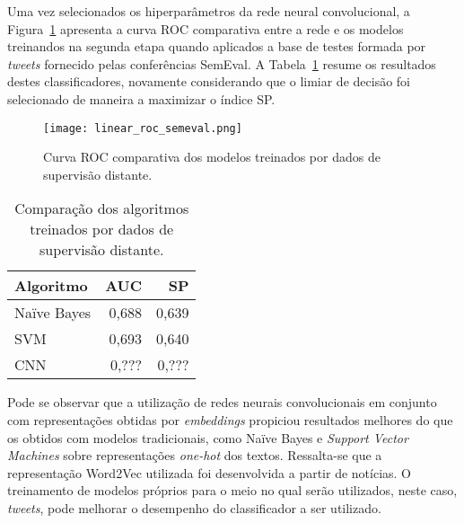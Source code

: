 Uma vez selecionados os hiperparâmetros da rede neural convolucional, a Figura~\ref{fig:all_roc_semeval} apresenta a
curva ROC comparativa entre a rede e os modelos treinandos na segunda etapa quando aplicados a base de testes formada
por \textit{tweets} fornecido pelas conferências SemEval.
A Tabela~\ref{tab:all_compara} resume os resultados destes classificadores, novamente considerando que o limiar de
decisão foi selecionado de maneira a maximizar o índice SP.

\begin{figure}
\begin{center} {
    \begin{center}
    \texttt{[image: linear\_roc\_semeval.png]}
    \caption{Curva ROC comparativa dos modelos treinados por dados de supervisão distante.}
    \label{fig:all_roc_semeval}
    \end{center}
}
\end{center}
\end{figure}

\begin{table}[h]
    \begin{center}
        \begin{tabular}{| l | r | r |}
        \hline
        \textbf{Algoritmo} & \textbf{AUC} & \textbf{SP} \\ \hline
        Naïve Bayes & 0,688 & 0,639 \\ \hline
        SVM & 0,693 & 0,640 \\ \hline
        CNN & 0,??? & 0,??? \\ \hline
        \end{tabular}
        \caption{Comparação dos algoritmos treinados por dados de supervisão distante.}
        \label{tab:all_compara}
    \end{center}
\end{table}

Pode se observar que a utilização de redes neurais convolucionais em conjunto com representações obtidas por
\textit{embeddings} propiciou resultados melhores do que os obtidos com modelos tradicionais, como Naïve Bayes e
\textit{Support Vector Machines} sobre representações \textit{one-hot} dos textos.
Ressalta-se que a representação Word2Vec utilizada foi desenvolvida a partir de notícias.
O treinamento de modelos próprios para o meio no qual serão utilizados, neste caso, \textit{tweets}, pode melhorar o
desempenho do classificador a ser utilizado.
